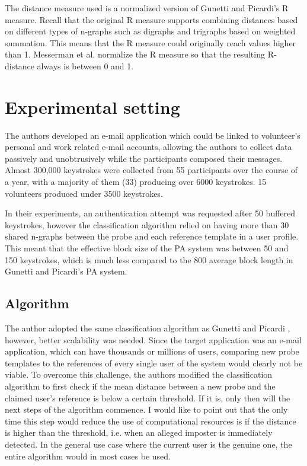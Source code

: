 \documentclass[informationsecurity]{gucmasterproject}
\begin{document}
The distance measure used is a normalized version of Gunetti and Picardi's R measure.
Recall that the original R measure supports combining distances based on different types of n-graphs such as digraphs and trigraphs based on weighted summation.
This means that the R measure could originally reach values higher than 1.
Messerman et al. \cite{Messerman} normalize the R measure so that the resulting R-distance always is between 0 and 1.

\section{Experimental setting}
\label{sec:messerman-experimental}
The authors developed an e-mail application which could be linked to volunteer's personal and work related e-mail accounts, allowing the authors to collect data passively and unobtrusively while the participants composed their messages.
Almost 300,000 keystrokes were collected from 55 participants over the course of a year, with a majority of them (33) producing over 6000 keystrokes.
15 volunteers produced under 3500 keystrokes.

In their experiments, an authentication attempt was requested after 50 buffered keystrokes, however the classification algorithm relied on having more than 30 shared n-graphs between the probe and each reference template in a user profile. This meant that the effective block size of the PA system was between 50 and 150 keystrokes, which is much less compared to the 800 average block length in Gunetti and Picardi's \cite{gnp} PA system.

\subsection{Algorithm}
The author adopted the same classification algorithm as Gunetti and Picardi \cite{gnp}, however, better scalability was needed.
Since the target application was an e-mail application, which can have thousands or millions of users, comparing new probe templates to the references of every single user of the system would clearly not be viable.
To overcome this challenge, the authors modified the classification algorithm to first check if the mean distance between a new probe and the claimed user's reference is below a certain threshold.
If it is, only then will the next steps of the algorithm commence.
I would like to point out that the only time this step would reduce the use of computational resources is if the distance is higher than the threshold, i.e. when an alleged imposter is immediately detected.
In the general use case where the current user is the genuine one, the entire algorithm would in most cases be used.
\end{document}
